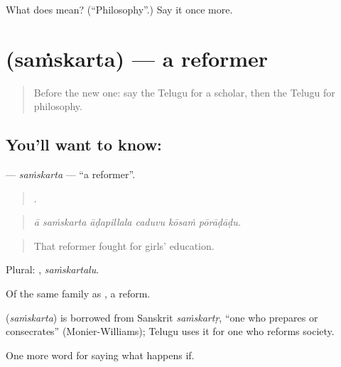 \begin{tcolorbox}[breakable,colback=teal!4,colframe=teal!35!black,title={Before you move on}]
What does  mean? (\textquotedblleft{}Philosophy\textquotedblright{}.) Say it once more.
\end{tcolorbox}
\section[\texorpdfstring{\te{సంస్కర్త} (saṁskarta)}{సంస్కర్త (saṁskarta)}]{ (saṁskarta) — a reformer}

\label{lesson:TE-C435-samskarta}



\begin{quote}
Before the new one: say the Telugu for a scholar, then the Telugu for philosophy.
\end{quote}

\subsection*{You'll want to know: }
\textbf{} — \emph{saṁskarta} — \textquotedblleft{}a reformer\textquotedblright{}.

\begin{quote}
     .
\end{quote}

\begin{quote}
\emph{ā saṁskarta āḍapillala caduvu kōsaṁ pōrāḍāḍu.}
\end{quote}

\begin{quote}
That reformer fought for girls’ education.
\end{quote}

Plural: , \emph{saṁskartalu}.

Of the same family as , a reform.

\begin{cousinweb}
\textbf{} (\emph{saṁskarta}) is borrowed from Sanskrit \emph{saṁskartṛ}, \textquotedblleft{}one who prepares or consecrates\textquotedblright{} (Monier-Williams); Telugu uses it for one who reforms society.
\end{cousinweb}

\begin{grammarlens}[title={What you've built}]
One more word for saying what happens if.
\end{grammarlens}

